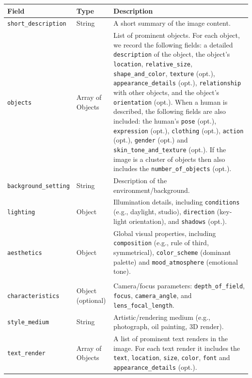 \begin{table}[t]
\small
\setlength{\tabcolsep}{6pt}
\renewcommand{\arraystretch}{1.02}
\centering
\begin{tabularx}{\textwidth}{@{}p{3.9cm}p{2.4cm}X@{}}
\toprule
\textbf{Field} & \textbf{Type} & \textbf{Description} \\
\midrule
\texttt{short\_description} & String & A short summary of the image content. \\

\texttt{objects} & Array of Objects &
List of prominent objects. For each object, we record the following fields:
a detailed \texttt{description} of the object, the object's \texttt{location}, \texttt{relative\_size}, \texttt{shape\_and\_color}, \texttt{texture} (opt.), \texttt{appearance\_details} (opt.),
\texttt{relationship} with other objects, and the object's \texttt{orientation} (opt.).
When a human is described, the following fields are also included: the human's \texttt{pose} (opt.), \texttt{expression} (opt.), \texttt{clothing} (opt.), \texttt{action} (opt.), \texttt{gender} (opt.) and \texttt{skin\_tone\_and\_texture} (opt.).
If the image is a cluster of objects then also includes the
\texttt{number\_of\_objects} (opt.).\\

\texttt{background\_setting} & String &
Description of the environment/background. \\

\texttt{lighting} & Object &
Illumination details, including
\texttt{conditions} (e.g., daylight, studio),
\texttt{direction} (key-light orientation), and
\texttt{shadows} (opt.). \\

\texttt{aesthetics} & Object &
Global visual properties, including
\texttt{composition} (e.g., rule of third, symmetrical),
\texttt{color\_scheme} (dominant palette) and
\texttt{mood\_atmosphere} (emotional tone). \\

\shortstack[l]{\texttt{photographic\_}\\\texttt{characteristics}} & Object (optional) &
Camera/focus parameters:
\texttt{depth\_of\_field},
\texttt{focus},
\texttt{camera\_angle}, and
\texttt{lens\_focal\_length}. \\

\texttt{style\_medium} & String &
Artistic/rendering medium (e.g., photograph, oil painting, 3D render). \\

\texttt{text\_render} & Array of Objects &
A list of prominent text renders in the image. For each text render it includes the
\texttt{text},
\texttt{location},
\texttt{size},
\texttt{color},
\texttt{font} and
\texttt{appearance\_details} (opt.). \\


\end{tabularx}
\end{table}
